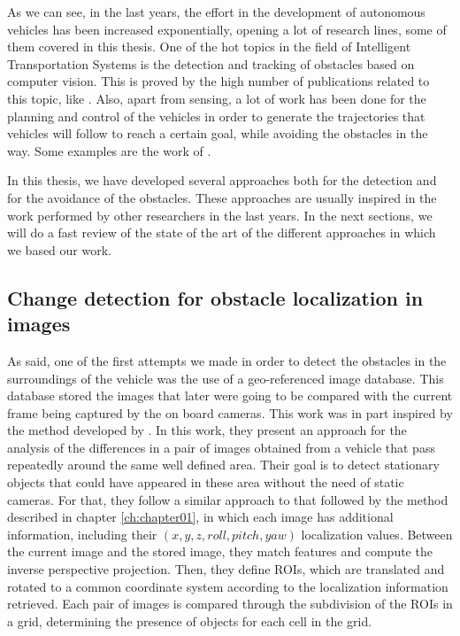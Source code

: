 As we can see, in the last years, the effort in the development of autonomous vehicles has been increased exponentially, opening a lot of research lines, some of them covered in this thesis. One of the hot topics in the field of Intelligent Transportation Systems is the detection and tracking of obstacles based on computer vision. This is proved by the high number of publications related to this topic, like \cite{Broggi2006, Broggi2010, primdahl2005change, Scharstein2002, Morales2011, Geiger2012, Steingrube2009, Morales2012, Morales2009, badino2009stixel, gunyel2012stixels, danescu2012particle, broggi2013}.
Also, apart from sensing, a lot of work has been done for the planning and control of the vehicles in order to generate the trajectories that vehicles will follow to reach a certain goal, while avoiding the obstacles in the way. Some examples are the work of \cite{werling2010optimal, thrun2006stanley, chu2012local}.

In this thesis, we have developed several approaches both for the detection and for the avoidance of the obstacles. These approaches are usually inspired in the work performed by other researchers in the last years. In the next sections, we will do a fast review of the state of the art of the different approaches in which we based our work. 

\subsection{Change detection for obstacle localization in images}\label{ch:chapter00_02_01}

As said, one of the first attempts we made in order to detect the obstacles in the surroundings of the vehicle was the use of a geo-referenced image database. This database stored the images that later were going to be compared with the current frame being captured by the on board cameras. This work was in part inspired by the method developed by \cite{primdahl2005change}. In this work, they present an approach for the analysis of the differences in a pair of images obtained from a vehicle that pass repeatedly around the same well defined area. Their goal is to detect stationary objects that could have appeared in these area without the need of static cameras. For that, they follow a similar approach to that followed by the method described in chapter \ref{ch:chapter01}, in which each image has additional information, including their $(x, y, z, roll, pitch, yaw)$ localization values. Between the current image and the stored image, they match features and compute the inverse perspective projection. Then, they define \acp{ROI}, which are translated and rotated to a common coordinate system according to the localization information retrieved. Each pair of images is compared through the subdivision of the \acp{ROI} in a grid, determining the presence of objects for each cell in the grid.

